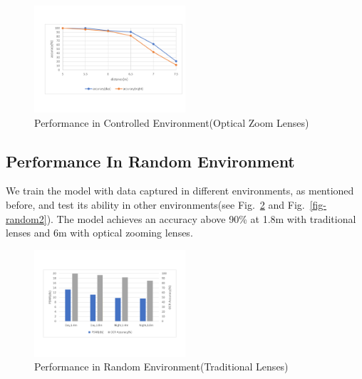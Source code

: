 \begin{figure}
 \centering
    \includegraphics[width=0.5\textwidth]{./pic/distance.pdf}
    \caption{Performance in Controlled Environment(Optical Zoom Lenses)}
    \label{fig-control2}
\end{figure}
\subsection{Performance In Random Environment}
We train the model with data captured in different environments, as mentioned before, and test its ability in other environments(see Fig.~\ref{fig-random} and Fig.~\ref{fig-random2}). The model achieves an accuracy above 90\% at 1.8m with traditional lenses and 6m with optical zooming lenses. 

\begin{figure}
 \centering
    \includegraphics[width=0.5\textwidth]{./pic/table2.pdf}
    \caption{Performance in Random Environment(Traditional Lenses)}
    \label{fig-random}
\end{figure}

